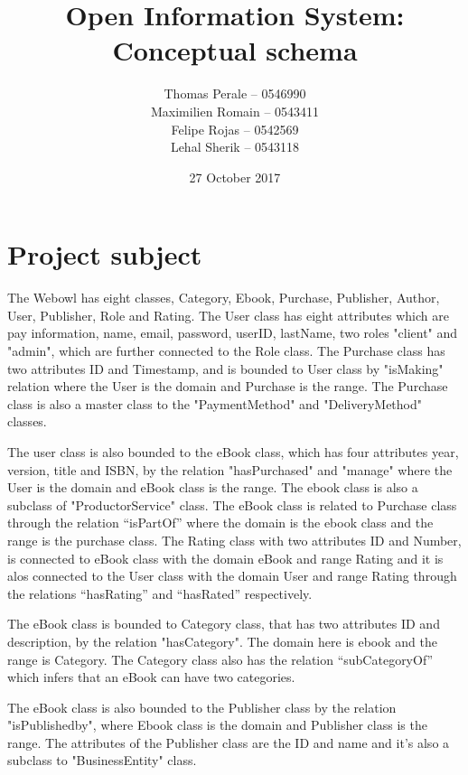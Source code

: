 ﻿\documentclass[a4paper,11pt]{article}
\begin{document}
\title{Open Information System: Conceptual schema}
\author{Thomas Perale -- 0546990\\Maximilien Romain -- 0543411\\Felipe Rojas -- 0542569\\Lehal Sherik -- 0543118}
\date{27 October 2017}

\maketitle

\section{Project subject}

The Webowl has eight classes, Category, Ebook, Purchase, Publisher, Author, User, Publisher, Role and Rating.
The User class has eight attributes which are pay information, name, email, password, userID, lastName, two roles "client" and "admin", which are further connected to the Role class.
The Purchase class has two attributes ID and Timestamp, and is bounded to User class by "isMaking" relation where the User is the domain and Purchase is the range. The Purchase class is also a master class to the "PaymentMethod" and "DeliveryMethod" classes.


The user class is also bounded to the eBook class, which has four attributes year, version, title and ISBN, by the relation "hasPurchased" and "manage" where the User is the domain and eBook class is the range. The ebook class is also a subclass of "ProductorService" class. The eBook class is related to Purchase class through the relation “isPartOf” where the domain is the ebook class and the range is the purchase class. 
The Rating class with two attributes ID and Number, is connected to eBook class with the domain eBook and range Rating and it is alos connected to the User class with the domain User and range Rating through the relations “hasRating” and “hasRated” respectively.

The eBook class is bounded to Category class, that has two attributes ID and description, by the relation "hasCategory". The domain here is ebook and the range is Category. The Category class also has the relation “subCategoryOf” which infers that an eBook can have two categories.

The eBook class is also bounded to the Publisher class by the relation "isPublishedby", where Ebook class is the domain and Publisher class is the range. The attributes of the Publisher class are the ID and name and it's also a subclass to "BusinessEntity" class.
\end{document}
